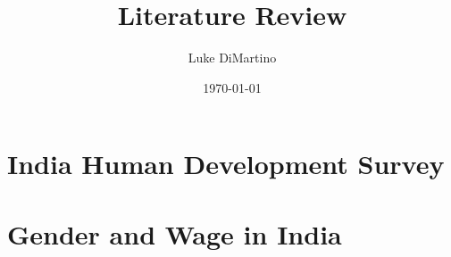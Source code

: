 \documentclass[a4paper]{article}
\title{Literature Review}
\author{Luke DiMartino}
\date{\today}
\begin{document}
\maketitle

\section{India Human Development Survey}

\section{Gender and Wage in India}
\end{document}
